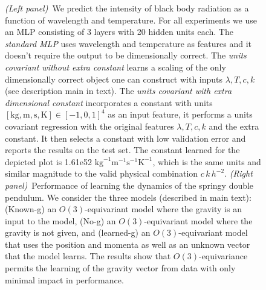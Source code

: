 \documentclass{article}
\theoremstyle{plain}
\theoremstyle{definition}
\theoremstyle{remark}
\newcommand{\unit}[1]{\mathrm{#1}}
\newcommand{\kg}{\unit{kg}}
\newcommand{\m}{\unit{m}}
\newcommand{\s}{\unit{s}}
\newcommand{\K}{\unit{K}}
\begin{document}
\begin{figure}[t!]
\begin{minipage}{0.5\textwidth}
    \end{minipage}
    \caption{\textsl{(Left panel)}~We predict the intensity of black body radiation as a function of wavelength and temperature. For all experiments we use an MLP consisting of 3 layers with 20 hidden units each. The \emph{standard MLP} uses wavelength and temperature as features and it doesn't require the output to be dimensionally correct. The \emph{units covariant without extra constant} learns a scaling of the only dimensionally correct object one can construct with inputs $\lambda, T, c, k$ (see description main in text). The \emph{units covariant with extra dimensional constant} incorporates a constant with units $[\kg, \m, \s, \K]\in[-1,0,1]^4$ as an input feature, it performs a units covariant regression with the original features $\lambda, T, c, k$ and the extra constant. It then selects a constant with low validation error and reports the results on the test set. The constant learned for the depicted plot is 1.61e52 $\kg^{-1}\m^{-1}\s^{-1}\K^{-1}$, which is the same units and similar magnitude to the valid physical combination $c\,k\,h^{-2}$.
    \textsl{(Right panel)}~Performance of learning the dynamics of the springy double pendulum. We consider the three models (described in main text): (Known-g) an $O(3)$-equivariant model where the gravity is an input to the model, (No-g) an $O(3)$-equivariant model where the gravity is not given, and (learned-g) an $O(3)$-equivariant model that uses the position and momenta as well as an unknown vector that the model learns. The results show that $O(3)$-equivariance permits the learning of the gravity vector from data with only minimal impact in performance.}
    \label{fig:my_label}
    \vspace{-1ex}
\end{figure}
\end{document}
